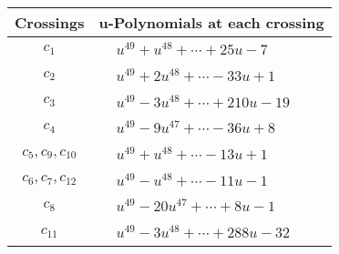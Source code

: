 \documentclass[1p]{elsarticle_modified}
\theoremstyle{definition}
\begin{document}
\begin{tabular}{m{50pt}|m{274pt}}
Crossings & \hspace{64pt}u-Polynomials at each crossing \\
\hline $$\begin{aligned}c_{1}\end{aligned}$$&$\begin{aligned}
&u^{49}+u^{48}+\cdots+25 u-7
\end{aligned}$\\
\hline $$\begin{aligned}c_{2}\end{aligned}$$&$\begin{aligned}
&u^{49}+2 u^{48}+\cdots-33 u+1
\end{aligned}$\\
\hline $$\begin{aligned}c_{3}\end{aligned}$$&$\begin{aligned}
&u^{49}-3 u^{48}+\cdots+210 u-19
\end{aligned}$\\
\hline $$\begin{aligned}c_{4}\end{aligned}$$&$\begin{aligned}
&u^{49}-9 u^{47}+\cdots-36 u+8
\end{aligned}$\\
\hline $$\begin{aligned}c_{5},c_{9},c_{10}\end{aligned}$$&$\begin{aligned}
&u^{49}+u^{48}+\cdots-13 u+1
\end{aligned}$\\
\hline $$\begin{aligned}c_{6},c_{7},c_{12}\end{aligned}$$&$\begin{aligned}
&u^{49}- u^{48}+\cdots-11 u-1
\end{aligned}$\\
\hline $$\begin{aligned}c_{8}\end{aligned}$$&$\begin{aligned}
&u^{49}-20 u^{47}+\cdots+8 u-1
\end{aligned}$\\
\hline $$\begin{aligned}c_{11}\end{aligned}$$&$\begin{aligned}
&u^{49}-3 u^{48}+\cdots+288 u-32
\end{aligned}$\\
\hline
\end{tabular}\\~\\
\end{document}
